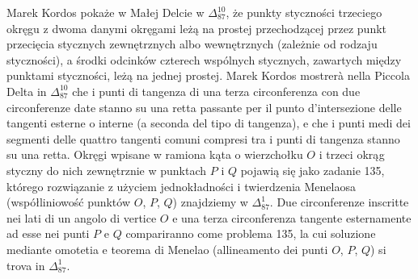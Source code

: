 Marek Kordos pokaże w Małej Delcie w $\Delta_{87}^{10}$, że punkty styczności trzeciego okręgu z dwoma danymi okręgami leżą na prostej przechodzącej przez punkt przecięcia stycznych zewnętrznych albo wewnętrznych (zależnie od rodzaju styczności), a środki odcinków czterech wspólnych stycznych, zawartych między punktami styczności, leżą na jednej prostej. %
Marek Kordos mostrerà nella Piccola Delta in $\Delta_{87}^{10}$ che i punti di tangenza di una terza circonferenza con due circonferenze date stanno su una retta passante per il punto d'intersezione delle tangenti esterne o interne (a seconda del tipo di tangenza), e che i punti medi dei segmenti delle quattro tangenti comuni compresi tra i punti di tangenza stanno su una retta. %
Okręgi wpisane w ramiona kąta o wierzchołku $O$ i trzeci okrąg styczny do nich zewnętrznie w punktach $P$ i $Q$ pojawią się jako zadanie 135, którego rozwiązanie z użyciem jednokładności i twierdzenia Menelaosa (współliniowość punktów $O$, $P$, $Q$) znajdziemy w $\Delta_{87}^{1}$. %
Due circonferenze inscritte nei lati di un angolo di vertice $O$ e una terza circonferenza tangente esternamente ad esse nei punti $P$ e $Q$ compariranno come problema 135, la cui soluzione mediante omotetia e teorema di Menelao (allineamento dei punti $O$, $P$, $Q$) si trova in $\Delta_{87}^{1}$. %


%
